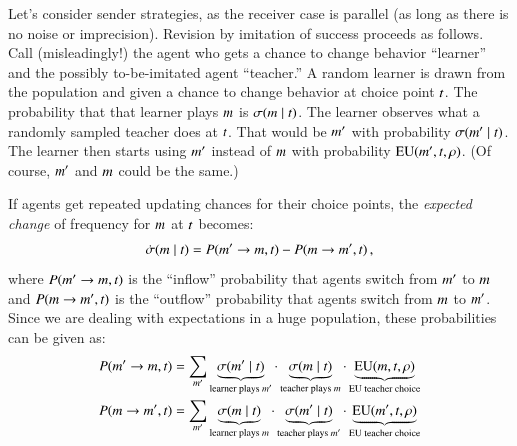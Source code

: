 \documentclass[fleqn,reqno,10pt]{article}
\begin{document}
Let's consider sender strategies, as the receiver case is parallel (as long as there is no
noise or imprecision). Revision by imitation of success proceeds as follows. Call
(misleadingly!) the agent who gets a chance to change behavior ``learner'' and the possibly
to-be-imitated agent ``teacher.'' A random learner is drawn from the population and given a
chance to change behavior at choice point $t$. The probability that that learner plays
$m$ is $\sigma(m \mid t)$. The learner observes what a randomly sampled
teacher does at $t$. That would be $m'$ with probability $\sigma(m' \mid
t)$. The learner then starts using $m'$ instead of $m$ with probability
$\mathrm{EU}(m', t, \rho)$. (Of course, $m'$ and $m$ could be the same.)

If agents get repeated updating chances for their choice points, the \emph{expected change} of
frequency for $m$ at $t$ becomes:
\begin{align}
  \label{eq:MeanChange}
  \dot{\sigma}(m \mid t) = P(m' \rightarrow m, t) - P(m \rightarrow m', t)\,,
\end{align}
where $P(m' \rightarrow m, t)$ is the ``inflow'' probability that agents switch from
$m'$ to $m$ and $P(m \rightarrow m', t)$ is the ``outflow'' probability
that agents switch from $m$ to $m'$. Since we are dealing with expectations in a huge
population, these probabilities can be given as:
\begin{align*}
  P(m' \rightarrow m, t) & = \sum_{m'} \underbrace{\sigma(m' \mid
    t)}_{\text{learner plays $m'$}} \cdot
  \underbrace{\sigma(m \mid t)}_{\text{teacher plays $m$}} \cdot
  \underbrace{\mathrm{EU}(m, t, \rho)}_{\text{EU teacher choice}} \\
  P(m \rightarrow m', t) & = \sum_{m'} \underbrace{\sigma(m \mid
    t)}_{\text{learner plays $m$}} \cdot
  \underbrace{\sigma(m' \mid t)}_{\text{teacher plays $m'$}} \cdot
  \underbrace{\mathrm{EU}(m', t, \rho)}_{\text{EU teacher choice}}
\end{align*}
\end{document}
